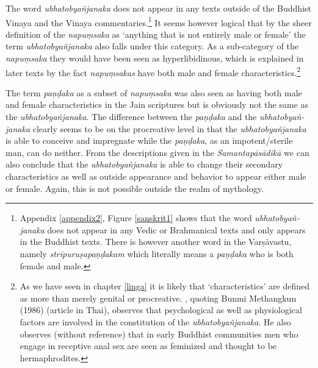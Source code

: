 The word {\em ubhatob­yañ­janaka} does not appear in any texts outside of the Buddhist Vinaya and the Vinaya commentaries.\footnote{Appendix \ref{appendix2}, Figure \ref{sanskrit1} shows that the word {\em ubhatob­yañ­janaka} does not appear in any Vedic or Brahmanical texts and only appears in the Buddhist texts. There is however another word in the {\m Varṣāvastu}, namely {\em strīpuruṣapaṇḍakam} which literally means a {\em paṇḍaka} who is both female and male.} It seems however logical that by the sheer definition of the {\em napuṃsaka} as `anything that is not entirely male or female' the term {\em ubhatob­yañ­janaka} also falls under this category. As a sub-category of the {\em napuṃsaka} they would have been seen as hyperlibidinous, which is explained in later texts by the fact {\em napuṃsakas} have both male and female characteristics.\footnote{As we have seen in chapter \ref{linga} it is likely that `characteristics' are defined as more than merely genital or procreative. \cite{jackson}, quoting Bunmi Methangkun (1986) (article in Thai), observes that psychological as well as physiological factors are involved in the constitution of the {\em ubhatob­yañ­janaka}. He also observes (without reference) that in early Buddhist communities men who engage in receptive anal sex are seen as feminized and thought to be hermaphrodites.} 

The term {\em paṇḍaka} as a subset of {\em napuṃsaka} was also seen as having both male and female characteristics in the Jain scriptures but is obviously not the same as the {\em ubhatob­yañ­janaka}. The difference between the {\em paṇḍaka} and the {\em ubhatob­yañ­janaka} clearly seems to be on the procreative level in that the {\em ubhatob­yañ­janaka} is able to conceive and impregnate while the {\em paṇḍaka}, as an impotent/sterile man, can do neither. From the descriptions given in the {\em Samantapāsādikā} we can also conclude that the {\em ubhatob­yañ­janaka} is able to change their secondary characteristics as well as outside appearance and behavior to appear either male or female. Again, this is not possible outside the realm of mythology.

